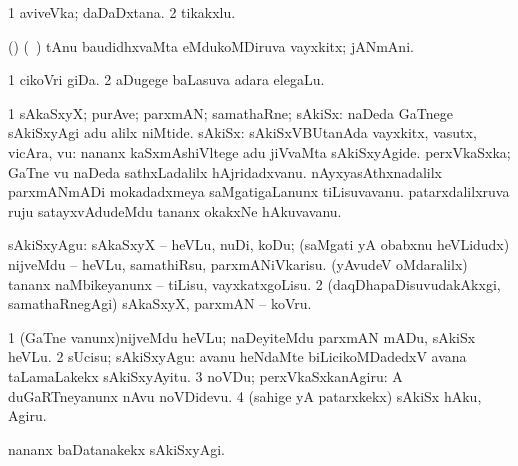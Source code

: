{{{{{{\bentry
{} 
\gl{\nA}
\expl{}
\bmng
\bnum
\num{1} aviveVka; daDaDxtana. 
\num{2} tikakxlu. 
\enum
\emng
\eentry

\bentry
{} 
\gl{\nA}
\expl{}
\bmng
(\pArxparx) (\sA\ \hiV) tAnu baudidhxvaMta eMdukoMDiruva vayxkitx; jANmAni. 
\emng
\eentry

\bentry
{} 
\gl{\nA}
\expl{}
\bmng
\bnum
\num{1} cikoVri giDa. 
\num{2} aDugege baLasuva adara elegaLu. 
\enum
\emng
\eentry

\bentry
{} 
\gl{\nA}
\expl{}
\bmng
\bnum
\num{1} sAkaSxyX; purAve; parxmAN; samathaRne; sAkiSx:  naDeda GaTnege sAkiSxyAgi adu alilx niMtide. 
 sAkiSx: 
\banum
{} sAkiSxVBUtanAda vayxkitx, vasutx, vicAra, \mo vu:  nananx kaSxmAshiVltege adu jiVvaMta sAkiSxyAgide. 
 perxVkaSxka; GaTne \mo vu naDeda sathxLadalilx hAjridadxvanu. 
 nAyxyasAthxnadalilx parxmANmADi mokadadxmeya saMgatigaLanunx tiLisuvavanu. 
 patarxdalilxruva ruju satayxvAdudeMdu tananx okakxNe hAkuvavanu. 
\eanum
\numie
\enum
\emng

\noindent
\gl{\pagu}
\expl{}
\bmng
\bnum
{}  
\banum
{} sAkiSxyAgu: sAkaSxyX -- heVLu, nuDi, koDu; (saMgati yA obabxnu heVLidudx) nijveMdu -- heVLu, samathiRsu, parxmANiVkarisu. 
 (yAvudeV oMdaralilx) tananx naMbikeyanunx -- tiLisu, vayxkatxgoLisu. 
\eanum
\numie
\num{2}  (daqDhapaDisuvudakAkxgi, samathaRnegAgi) sAkaSxyX, parxmAN -- koVru. 
\enum
\emng
\eentry

\bentry
{} 
\gl{\sakirx}
\expl{}
\bmng
\bnum
\num{1} (GaTne \mo vanunx)nijveMdu heVLu; naDeyiteMdu parxmAN mADu, sAkiSx heVLu. 
\num{2} sUcisu; sAkiSxyAgu:  avanu heNdaMte biLicikoMDadedxV avana taLamaLakekx sAkiSxyAyitu. 
\num{3} noVDu; perxVkaSxkanAgiru:  A duGaRTneyanunx nAvu noVDidevu. 
\num{4} (sahige yA patarxkekx) sAkiSx hAku, Agiru. 
\enum
\emng

\noindent
\gl{\akirx}
\enum
\emng

\noindent 
\gl{\pagu}
\expl{}
\bmng
{}  nananx baDatanakekx sAkiSxyAgi. 
\emng
\eentry

}}}}}}
